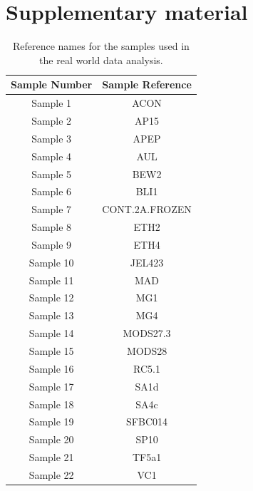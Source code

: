 \documentclass[11pt]{article}
\begin{document}
\section{Supplementary material}
\begin{adjustbox}{angle=90,center,caption={The resulting parameters from fitting mixtures of Poisson distributions to the real world data samples.},nofloat=table}
\begin{tiny}
\end{tiny}
\end{adjustbox}
\pagebreak
\begin{adjustbox}{angle=90,center,caption={The resulting parameters from fitting mixtures of Negative Binomial distributions to the real world data samples.},nofloat=table}
\begin{tiny}
\end{tiny}
\end{adjustbox}

\begin{table}[H]
\begin{center}
\caption{Reference names for the samples used in the real world data analysis.}
\begin{tabular}{|c|c|}
\hline
\textbf{Sample Number} & \textbf{Sample Reference} \\
\hline
\hline
Sample 1 & ACON \\
\hline
Sample 2 & AP15 \\
\hline
Sample 3 & APEP \\
\hline
Sample 4 & AUL \\
\hline
Sample 5 & BEW2 \\
\hline
Sample 6 & BLI1 \\
\hline
Sample 7 & CONT.2A.FROZEN \\
\hline
Sample 8 & ETH2 \\
\hline
Sample 9 & ETH4 \\
\hline
Sample 10 & JEL423 \textunderscore 2014 \\
\hline
Sample 11 & MAD \\
\hline
Sample 12 & MG1 \\
\hline
Sample 13 & MG4 \\
\hline
Sample 14 & MODS27.3 \\
\hline
Sample 15 & MODS28 \\
\hline
Sample 16 & RC5.1 \\
\hline
Sample 17 & SA1d \\
\hline
Sample 18 & SA4c \\
\hline
Sample 19 & SFBC014 \\
\hline
Sample 20 & SP10 \\
\hline
Sample 21 & TF5a1 \\
\hline
Sample 22 & VC1 \\
\hline


\end{tabular}
\end{center}
\end{table}
\end{document}
